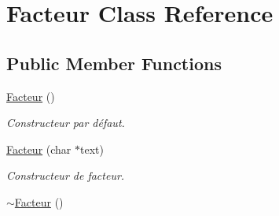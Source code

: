 \hypertarget{class_facteur}{\section{Facteur Class Reference}
\label{class_facteur}
}
\subsection*{Public Member Functions}
\begin{DoxyCompactItemize}
\item 
\hypertarget{class_facteur_a989e3e6f53f97d5adfd2e7e3fc1f4cf1}{\hyperlink{class_facteur_a989e3e6f53f97d5adfd2e7e3fc1f4cf1}{Facteur} ()}\label{class_facteur_a989e3e6f53f97d5adfd2e7e3fc1f4cf1}

\begin{DoxyCompactList}\small\item\em Constructeur par défaut. \end{DoxyCompactList}\item 
\hyperlink{class_facteur_af0d4423b4ebe026d9dbe8ef06eb23d9f}{Facteur} (char $\ast$text)
\begin{DoxyCompactList}\small\item\em Constructeur de facteur. \end{DoxyCompactList}\item 
\hypertarget{class_facteur_a71486fcb174b3a49520bf1e60fbf8e69}{\hyperlink{class_facteur_a71486fcb174b3a49520bf1e60fbf8e69}{$\sim$\-Facteur} ()}\label{class_facteur_a71486fcb174b3a49520bf1e60fbf8e69}


\end{DoxyCompactItemize}
